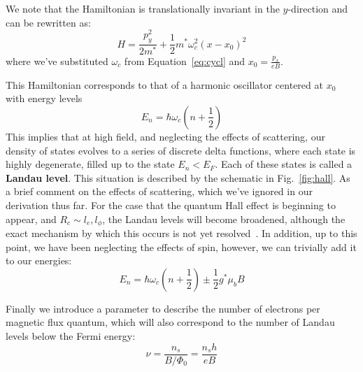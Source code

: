 We note that the Hamiltonian is translationally invariant in the $y$-direction and can be rewritten as:
\begin{equation}
  H = \frac{p_y^2}{2m^*} + \frac{1}{2}m^*\omega_c^2(x - x_0)^2
\end{equation}
where we've substituted $\omega_c$ from Equation~\ref{eq:cycl} and $x_0 = \tfrac{p_x}{eB}$.

This Hamiltonian corresponds to that of a harmonic oscillator centered at $x_0$ with energy levels
\begin{equation}
  E_n = \hbar \omega_c\left(n + \frac{1}{2}\right)
\end{equation}
This implies that at high field, and neglecting the effects of scattering, our density of states evolves to
a series of discrete delta functions, where each state is highly degenerate, filled up to the state $E_n < E_F$.
Each of these states is called a \textbf{Landau level}. This situation is described by the schematic in Fig.~\ref{fig:hall}.
As a brief comment on the effects of scattering, which we've ignored in our derivation thus far. For the case that the quantum Hall
effect is beginning to appear, and $R_c \sim l_e, l_\phi$, the Landau levels will become broadened, although the exact mechanism
by which this occurs is not yet resolved~\cite{PhysRevB.90.035425, PhysRevB.82.075401}. In addition, up to this point,
we have been neglecting the effects of spin, however, we can trivially add it to our energies:
\begin{equation}
  E_n = \hbar \omega_c\left(n + \frac{1}{2}\right) \pm \frac{1}{2}g^* \mu_b B
\end{equation}

Finally we introduce a parameter to describe the number of electrons per magnetic flux quantum, which will also correspond
to the number of Landau levels below the Fermi energy:
\begin{equation}
  \nu = \frac{n_s}{B / \Phi_0} = \frac{n_s h}{e B}
  \label{eq:nu}
\end{equation}


